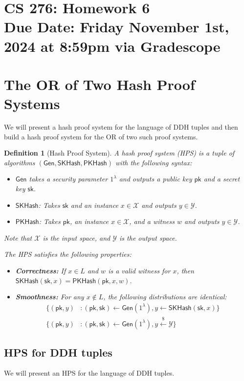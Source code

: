 \documentclass[11pt]{article}
\newtheorem{definition}[theorem]{Definition}
\numberwithin{equation}{section}
\newcommand{\cX}{\mathcal{X}}
\newcommand{\cY}{\mathcal{Y}}
\newcommand{\Gen}{\mathsf{Gen}}
\newcommand{\pk}{\mathsf{pk}}
\newcommand{\sk}{\mathsf{sk}}
\newcommand{\secp}{\lambda}
\newcommand{\getsr}{\stackrel{\$}{\gets}}
\newcommand{\duedate}{Friday November 1st, 2024 at 8:59pm via Gradescope}
\begin{document}
\section*{CS 276: Homework 6\\ {\small Due Date: \duedate} }

\section{The OR of Two Hash Proof Systems}
We will present a hash proof system for the language of DDH tuples and then build a hash proof system for the OR of two such proof systems.

\begin{definition}[Hash Proof System]
    A hash proof system (HPS) is a tuple of algorithms $(\Gen, \mathsf{SKHash}, \mathsf{PKHash})$ with the following syntax:
    \begin{itemize}
        \item $\Gen$ takes a security parameter $1^\secp$ and outputs a public key $\pk$ and a secret key $\sk$.
        \item $\mathsf{SKHash}$: Takes $\sk$ and an instance $x \in \cX$ and outputs $y \in \cY$.
        \item $\mathsf{PKHash}$: Takes $\pk$, an instance $x \in \cX$, and a witness $w$ and outputs $y \in \cY$.
    \end{itemize}
    Note that $\cX$ is the input space, and $\cY$ is the output space.
    
    The HPS satisfies the following properties:
    \begin{itemize}
        \item \textbf{Correctness:} If $x \in L$ and $w$ is a valid witness for $x$, then $\mathsf{SKHash}(\sk, x) = \mathsf{PKHash}(\pk, x, w)$.
        \item \textbf{Smoothness:} For any $x \notin L$, the following distributions are identical:
        \begin{align*}
            \{(\pk, y) &: (\pk, \sk) \gets \Gen(1^\secp), y \gets \mathsf{SKHash}(\sk, x)\}\\
            \{(\pk, y) &: (\pk, \sk) \gets \Gen(1^\secp), y \getsr \mathcal{Y}\}
        \end{align*}
    \end{itemize}
\end{definition}

\subsection{HPS for DDH tuples}
We will present an HPS for the language of DDH tuples.
\end{document}
